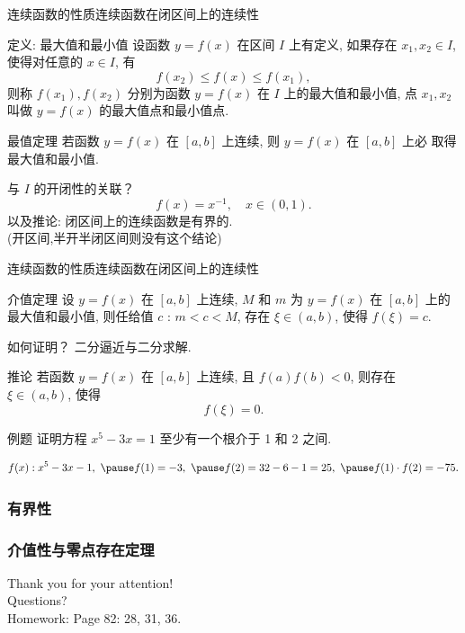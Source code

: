 \documentclass[
10pt,
aspectratio=43,
]{beamer}
\begin{document}
\begin{frame}{连续函数的性质}{连续函数在闭区间上的连续性}
	\begin{block}{定义: 最大值和最小值}
		设函数 $y=f(x)$ 在区间 $I$ 上有定义, 如果存在 $x_1, x_2 \in I$, 使得对任意的 $x \in I$, 有
		$$
		f\left(x_2\right) \leq f(x) \leq f\left(x_1\right),
		$$
		则称 $f\left(x_1\right), f\left(x_2\right)$ 分别为函数 $y=f(x)$ 在 $I$ 上的最大值和最小值, 点 $x_1, x_2$ 叫做 $y=f(x)$ 的最大值点和最小值点.
	\end{block}
	\pause
	\begin{block}{最值定理}
		若函数 $y=f(x)$ 在 $[a, b]$ 上连续, 则 $y=f(x)$ 在 $[a, b]$ 上必 取得最大值和最小值.
	\end{block}
	\pause 与 $I$ 的开闭性的关联？\pause 
	\begin{equation*}
		f(x) = x^{-1},\quad x\in(0,1).
	\end{equation*}
	\pause 以及推论: 闭区间上的连续函数是有界的.\\
	\pause (开区间,半开半闭区间则没有这个结论)
\end{frame}

\begin{frame}{连续函数的性质}{连续函数在闭区间上的连续性}
	\begin{block}{介值定理}
		设 $y=f(x)$ 在 $[a, b]$ 上连续, $M$ 和 $m$ 为 $y=f(x)$ 在 $[a, b]$ 上的最大值和最小值, 则任给值 $c$ : $m<c<M$, 存在 $\xi \in(a, b)$, 使得 $f(\xi)=c$.
	\end{block}
	\pause 如何证明？ \pause 二分逼近与二分求解.
	\begin{block}{推论}
		若函数 $y=f(x)$ 在 $[a, b]$ 上连续, 且 $f(a) f(b)<0$, 则存在 $\xi \in(a, b)$, 使得
		$$
		f(\xi)=0 .
		$$
	\end{block}

	\begin{exampleblock}{例题}
		证明方程 $x^5-3 x=1$ 至少有一个根介于 1 和 2 之间.
	\end{exampleblock}
	\begin{equation*}
		f(x):x^5-3 x-1, \,\, \pause f(1)=-3, \,\, \pause f(2)=32-6-1=25,\,\, \pause f(1)\cdot f(2) =-75.
	\end{equation*}
\end{frame}

\subsubsection{有界性}
\subsubsection{介值性与零点存在定理}




\begin{frame}[plain]
	\vfill
	\centering
	{
		\centering \Huge \color{white} Thank you for your attention!\\[10pt]Questions?\bigskip \\
		Homework: Page 82: 28, 31, 36.
	}
	\vfill
\end{frame}
\end{document}
